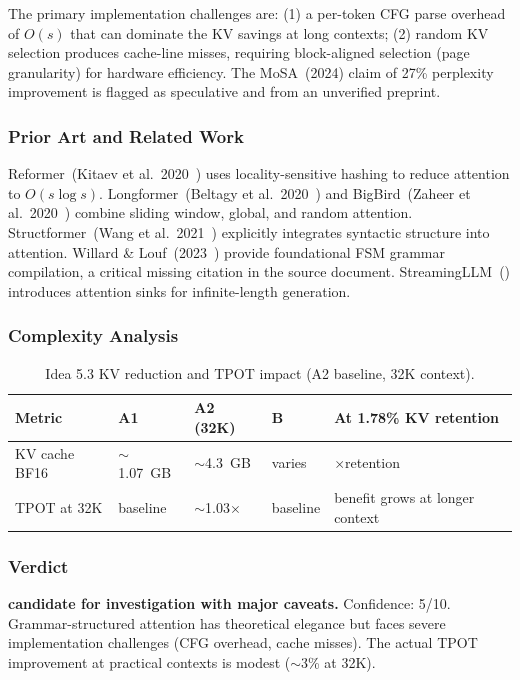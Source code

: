 \documentclass[11pt]{article}
\begin{document}
The primary implementation challenges are: (1) a per-token CFG parse overhead of $O(s)$ that can dominate the KV savings at long contexts; (2) random KV selection produces cache-line misses, requiring block-aligned selection (page granularity) for hardware efficiency. The MoSA~(2024) claim of 27\% perplexity improvement is flagged as speculative and from an unverified preprint.

\subsubsection*{Prior Art and Related Work}

Reformer~(Kitaev et al.\ 2020~\cite{KitaevReformer2020}) uses locality-sensitive hashing to reduce attention to $O(s \log s)$. Longformer~(Beltagy et al.\ 2020~\cite{BeltagyLongformer2020}) and BigBird~(Zaheer et al.\ 2020~\cite{ZaheerBigBird2020}) combine sliding window, global, and random attention. Structformer~(Wang et al.\ 2021~\cite{WangStructformer2021}) explicitly integrates syntactic structure into attention. Willard \& Louf~(2023~\cite{WillardLouf2023}) provide foundational FSM grammar compilation, a critical missing citation in the source document. StreamingLLM~(\cite{XiaoStreamingLLM2023}) introduces attention sinks for infinite-length generation.

\subsubsection*{Complexity Analysis}

\begin{table}[h]
\centering
\caption{Idea 5.3 KV reduction and TPOT impact (A2 baseline, 32K context).}
\small
\begin{tabular}{lllll}
\toprule
Metric & A1 & A2 (32K) & B & At 1.78\% KV retention \\
\midrule
KV cache BF16 & $\sim$1.07~GB & $\sim$4.3~GB & varies & $\times$retention \\
TPOT at 32K & baseline & $\sim$1.03$\times$ & baseline & benefit grows at longer context \\
\bottomrule
\end{tabular}
\end{table}

\subsubsection*{Verdict}

\noindent\textbf{candidate for investigation with major caveats.} Confidence: 5/10. Grammar-structured attention has theoretical elegance but faces severe implementation challenges (CFG overhead, cache misses). The actual TPOT improvement at practical contexts is modest ($\sim$3\% at 32K).
\end{document}
